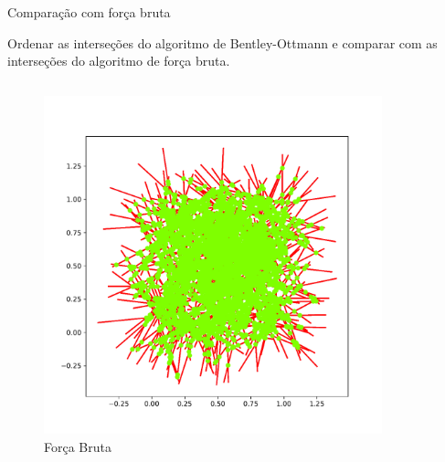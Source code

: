 \documentclass[aspectratio=169,usenames,dvipsnames]{beamer}
\begin{document}
\begin{frame}{Comparação com força bruta}

  Ordenar as interseções do algoritmo de Bentley-Ottmann e comparar com as interseções do algoritmo de força bruta.

   \begin{columns}
    \begin{column}{0.5\textwidth}
      \begin{figure}
        \includegraphics[width=\textwidth]{figs/exemplos/base_naive.pdf}
        \caption{Força Bruta}
      \end{figure}
    \end{column}
    \begin{column}{0.5\textwidth}
      \begin{figure}
        \centering

\end{figure}
\end{column}
\end{columns}
\end{frame}
\end{document}
